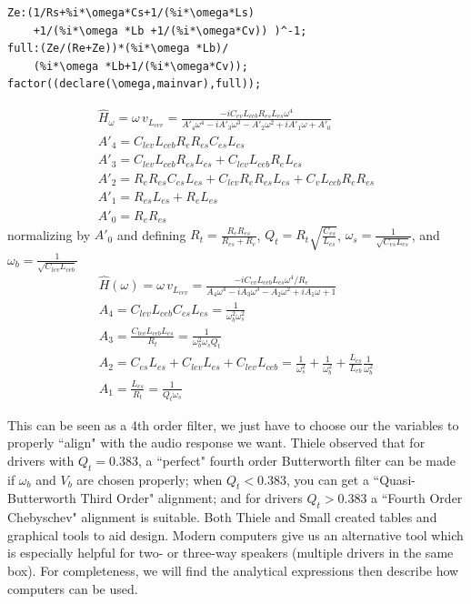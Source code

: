 \documentclass[10pt,letterpaper]{book}
\begin{document}
\begin{verbatim}
Ze:(1/Rs+%i*\omega*Cs+1/(%i*\omega*Ls)
    +1/(%i*\omega *Lb +1/(%i*\omega*Cv)) )^-1;
full:(Ze/(Re+Ze))*(%i*\omega *Lb)/
    (%i*\omega *Lb+1/(%i*\omega*Cv));
factor((declare(\omega,mainvar),full));
\end{verbatim}

\begin{align}
\hat{H}_\omega=\omega \, v_{L_{cev}}= \frac{
-i  C_{ev} L_{ceb} R_{es} L_{es} \omega^4}
{A'_4\omega^4-iA'_3\omega^3-A'_2\omega^2+iA'_1\omega+A'_0}\\
A'_4=C_{lev} L_{ceb} R_e R_{es}  C_{es} L_{es}\\
A'_3=C_{lev} L_{ceb} R_{es} L_{es}
+ C_{lev} L_{ceb} R_e L_{es}\\
A'_2=R_e R_{es}  C_{es} L_{es}+C_{lev} R_e R_{es} L_{es}+C_v L_{ceb} R_e R_{es}\\
A'_1=R_{es} L_{es}+R_e L_{es}\\
A'_0=R_e R_{es}
\end{align}
normalizing by $A'_0$ and defining $R_t=\frac{R_eR_{es}}{R_{es}+R_e}$, $Q_{t}=R_t\sqrt{\frac{C_{es}}{L_{es}}}$, $\omega_s=\frac{1}{\sqrt{C_{es}L_{es}}}$, and $\omega_b=\frac{1}{\sqrt{C_{lev}L_{ceb}}}$
\begin{align}
\hat{H}(\omega)=\omega \, v_{L_{cev}}= \frac{
-i  C_{ev} L_{ceb} L_{es} \omega^4/R_e}
{A_4\omega^4-iA_3\omega^3-A_2\omega^2+iA_1\omega+1}\\
A_4=C_{lev} L_{ceb} C_{es} L_{es}=\frac{1}{\omega_b^2\omega_s^2}\\
A_3=\frac{C_{lev} L_{ceb} L_{es}}{R_t}=\frac{1}{\omega_b^2\omega_s Q_{t}}\\
A_2=C_{es} L_{es}+C_{lev} L_{es}+C_{lev} L_{ceb}=\frac{1}{\omega_s^2}+\frac{1}{\omega_b^2}+\frac{L_{es}}{L_{eb}}\frac{1}{\omega_b^2}\\
A_1=\frac{L_{es}}{R_t}=\frac{1}{Q_{t}\omega_s}
\end{align}

This can be seen as a 4th order filter, we just have to choose our the variables to properly ``align" with the audio response we want. Thiele observed that for drivers with $Q_t=0.383$, a ``perfect" fourth order Butterworth filter can be made if $\omega_b$ and $V_b$ are chosen properly; when $Q_t<0.383$, you can get a ``Quasi-Butterworth Third Order" alignment; and for drivers $Q_t>0.383$ a ``Fourth Order Chebyschev" alignment is suitable. Both Thiele and Small created tables and graphical tools to aid design. Modern computers give us an alternative tool which is especially helpful for two- or three-way speakers (multiple drivers in the same box). For completeness, we will find the analytical expressions then describe how computers can be used.
\end{document}
